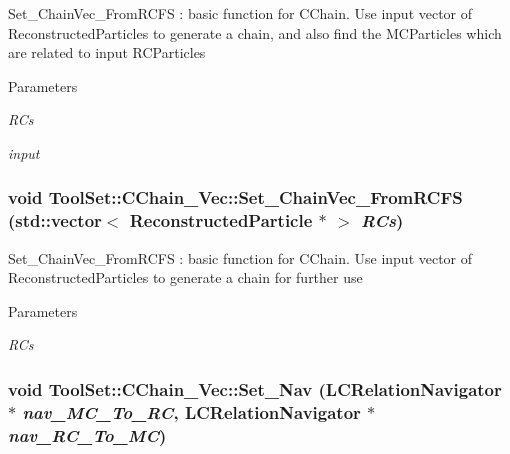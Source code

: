 Set\_\-ChainVec\_\-FromRCFS : basic function for CChain. Use input vector of ReconstructedParticles to generate a chain, and also find the MCParticles which are related to input RCParticles


\begin{DoxyParams}{Parameters}
\item[{\em RCs}]\item[{\em input}]\end{DoxyParams}
\hypertarget{classToolSet_1_1CChain__Vec_a869d89522896a4eff5d7f129859aeeb3}{
\subsubsection[{Set\_\-ChainVec\_\-FromRCFS}]{\setlength{\rightskip}{0pt plus 5cm}void ToolSet::CChain\_\-Vec::Set\_\-ChainVec\_\-FromRCFS (std::vector$<$ ReconstructedParticle $\ast$ $>$ {\em RCs})}}
\label{classToolSet_1_1CChain__Vec_a869d89522896a4eff5d7f129859aeeb3}


Set\_\-ChainVec\_\-FromRCFS : basic function for CChain. Use input vector of ReconstructedParticles to generate a chain for further use


\begin{DoxyParams}{Parameters}
\item[{\em RCs}]\end{DoxyParams}
\hypertarget{classToolSet_1_1CChain__Vec_ab62d10b8212ef4ad8eb6ba50e23fc9a0}{
\subsubsection[{Set\_\-Nav}]{\setlength{\rightskip}{0pt plus 5cm}void ToolSet::CChain\_\-Vec::Set\_\-Nav (LCRelationNavigator $\ast$ {\em nav\_\-MC\_\-To\_\-RC}, \/  LCRelationNavigator $\ast$ {\em nav\_\-RC\_\-To\_\-MC})}}
\label{classToolSet_1_1CChain__Vec_ab62d10b8212ef4ad8eb6ba50e23fc9a0}


